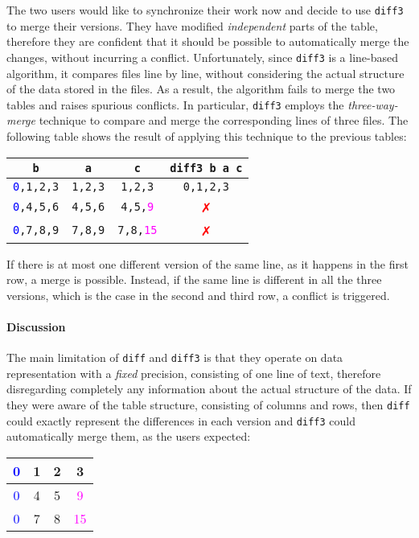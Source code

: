 \documentclass{sigplanconf}
\theoremstyle{plain}
\begin{document}
The two users would like to synchronize their work now and decide to
use \texttt{diff3} to merge their versions.
%
They have modified \emph{independent} parts of the table, therefore
they are confident that it should be possible to automatically
merge the changes, without incurring a conflict.
%
Unfortunately, since \texttt{diff3} is a line-based algorithm, it
compares files line by line, without considering the actual structure
of the data stored in the files. 
%
As a result, the algorithm fails to merge the two tables and raises
spurious conflicts.
%
In particular, \texttt{diff3} employs the \emph{three-way-merge}
technique to compare and merge the corresponding lines of three files.
%
The following table shows the result of applying this technique to the
previous tables:
\begin{center}
\begin{tabular}{| c | c | c | c |}
\hline
\texttt{b} & \texttt{a} & \texttt{c} & \texttt{diff3 b a c} \\ \hline
\texttt{\textcolor{blue}{0},1,2,3} & \texttt{1,2,3} & \texttt{1,2,3} & \textcolor{dgreen}{\texttt{0,1,2,3}} \\ \hline
\texttt{\textcolor{blue}{0},4,5,6} & \texttt{4,5,6} & \texttt{4,5,\textcolor{magenta}{9}} & \textcolor{red}{✗}  \\ \hline
\texttt{\textcolor{blue}{0},7,8,9} & \texttt{7,8,9} & \texttt{7,8,\textcolor{magenta}{15}} & \textcolor{red}{✗} \\ \hline
\end{tabular}
\end{center}
If there is at most one different version of the same line, as it
happens in the first row, a merge is possible.
%
Instead, if the same line is different in all the three versions,
which is the case in the second and third row, a conflict is
triggered.
%


\paragraph{Discussion}
The main limitation of \texttt{diff} and \texttt{diff3} is that they
operate on data representation with a \emph{fixed} precision,
consisting of one line of text, therefore disregarding completely any
information about the actual structure of the data.
%
If they were aware of the table structure, consisting of columns and
rows, then \texttt{diff} could exactly represent the differences in
each version and \texttt{diff3} could automatically merge them, as the
users expected:
\begin{center}
\begin{tabular}{| c | c | c | c |}
\hline
\textcolor{blue}{0} & 1 & 2 & 3 \\ \hline
\textcolor{blue}{0} & 4 & 5 & \textcolor{magenta}{9} \\ \hline
\textcolor{blue}{0} & 7 & 8 & \textcolor{magenta}{15} \\ \hline
\end{tabular}
\end{center}
\end{document}
